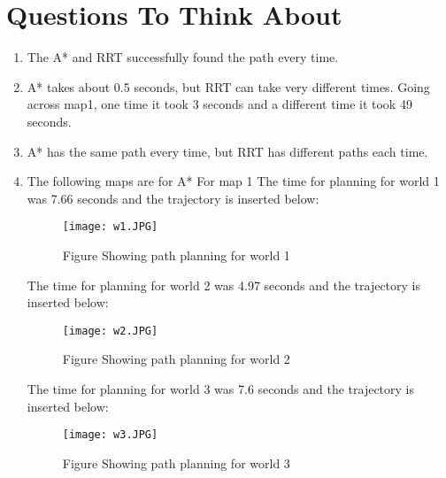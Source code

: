 \documentclass{article}
\begin{document}
\section{Questions To Think About} 

\begin{enumerate}
    \item The A* and RRT successfully found the path every time.
    
    \item A* takes about 0.5 seconds, but RRT can take very different times. Going across map1, one time it took 3 seconds and a different time it took 49 seconds.
    
    \item A* has the same path every time, but RRT has different paths each time.
    
    \item  The following maps are for A*
    For map 1 
    The time for planning for world 1 was 7.66 seconds  and the trajectory is inserted below: \\ 
    \renewcommand{\thefigure}{5.1.4.1}
\begin{center}
    \begin{figure}[H]
        \centering
        \texttt{[image: w1.JPG]}
         \caption{Figure Showing path planning for world 1}
    \end{figure}
\end{center}

    The time for planning for world 2 was 4.97 seconds  and the trajectory is inserted below: \\ 
    \renewcommand{\thefigure}{5.1.4.2}
\begin{center}
    \begin{figure}[H]
        \centering
        \texttt{[image: w2.JPG]}
         \caption{Figure Showing path planning for world 2}
    \end{figure}
\end{center}

    The time for planning for world 3 was 7.6 seconds  and the trajectory is inserted below: \\ 
    \renewcommand{\thefigure}{5.1.4.3}
\begin{center}
    \begin{figure}[H]
        \centering
        \texttt{[image: w3.JPG]}
         \caption{Figure Showing path planning for world 3}
    \end{figure}
\end{center}


\end{enumerate}
\end{document}
